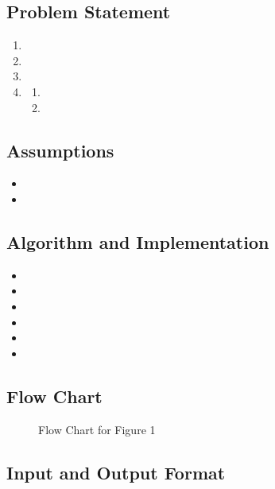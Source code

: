 \documentclass[12pt]{article}
\begin{document}
	
		\subsection{Problem Statement}
		
			\begin{enumerate}
				\item 
				\item 
				\item 
				\item  
				\begin{enumerate}
					\item 
					\item 
				\end{enumerate}
			\end{enumerate}
		
		\subsection{Assumptions}
		
			\begin{itemize}
				\item 
				\item 
			\end{itemize}
		
		\subsection{Algorithm and Implementation~\cite{}}
		
			\begin{itemize}
				\item 
				\item 
			    \item 
			    \item 
			    \item 
			    \item 
			\end{itemize}
		
		\subsection{Flow Chart}
		
			\begin{figure}[h!]
				\centering
				\caption{Flow Chart for Figure 1}
			\end{figure}
		
		\subsection{Input and Output Format}
		
\end{document}
